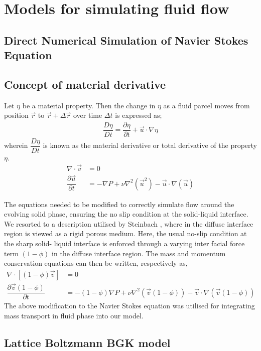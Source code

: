 \documentclass[12pt,a4paper]{report}
\begin{document}
\chapter{Models for simulating fluid flow}
	
\section{Direct Numerical Simulation of Navier Stokes Equation}
	\section{Concept of material derivative}
		Let $\eta$ be a material property. Then the change in $\eta$ as a fluid parcel moves from position $\vec{r}$ to $\vec{r}+\Delta \vec{r}$ over time $\Delta t$ is expressed as;
		\begin{align}
			\dfrac{D\eta}{Dt} = \dfrac{\partial \eta}{\partial t} + \vec{u}\cdot\nabla\eta
		\end{align}
	wherein $\dfrac{D\eta}{Dt}$ is known as the material derivative or total derivative of the property $\eta$. 
	\begin{align}
		\nabla\cdot\vec{v} &= 0\\
		\dfrac{\partial \vec{u}}{\partial t} &= - \nabla P + \nu\nabla^2\left(\vec{u}^2\right) - \vec{u}\cdot\nabla\left(\vec{u}\right)
	\end{align}
	
	The equations needed to be modified to correctly simulate flow around the evolving solid phase, ensuring the no slip condition
	at the solid-liquid interface. We resorted to a description utilised by Steinbach \cite{Stein}, where in the diffuse interface 
	region is viewed as a rigid porous medium. Here, the usual no-slip condition at the sharp solid- 
	liquid interface is enforced through a varying inter facial force term $(1-\phi)$ in the diffuse interface 
	region.
	The mass and momentum conservation equations can then be written, respectively as,
	\begin{align}
		\nabla\cdot[(1-\phi)\vec{v}] &= 0\\
		\dfrac{\partial \vec{v}(1-\phi)}{\partial t} &= -(1-\phi)\nabla P + \nu\nabla^2\left(\vec{v}(1-\phi)\right) - \vec{v}\cdot\nabla\left(\vec{v}(1-\phi)\right)
	\end{align}
	The above modification to the Navier Stokes equation was utilised for integrating mass transport in fluid phase into our model.

\section{Lattice Boltzmann BGK model}
	
\end{document}
